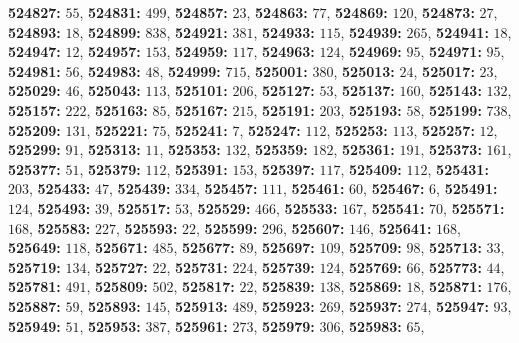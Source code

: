 \textsf{\bfseries 524827:} $55$, \textsf{\bfseries 524831:} $499$, \textsf{\bfseries 524857:} $23$, \textsf{\bfseries 524863:} $77$, \textsf{\bfseries 524869:} $120$, \textsf{\bfseries 524873:} $27$, \textsf{\bfseries 524893:} $18$, \textsf{\bfseries 524899:} $838$, \textsf{\bfseries 524921:} $381$, \textsf{\bfseries 524933:} $115$, \textsf{\bfseries 524939:} $265$, \textsf{\bfseries 524941:} $18$, \textsf{\bfseries 524947:} $12$, \textsf{\bfseries 524957:} $153$, \textsf{\bfseries 524959:} $117$, \textsf{\bfseries 524963:} $124$, \textsf{\bfseries 524969:} $95$, \textsf{\bfseries 524971:} $95$, \textsf{\bfseries 524981:} $56$, \textsf{\bfseries 524983:} $48$, \textsf{\bfseries 524999:} $715$, \textsf{\bfseries 525001:} $380$, \textsf{\bfseries 525013:} $24$, \textsf{\bfseries 525017:} $23$, \textsf{\bfseries 525029:} $46$, \textsf{\bfseries 525043:} $113$, \textsf{\bfseries 525101:} $206$, \textsf{\bfseries 525127:} $53$, \textsf{\bfseries 525137:} $160$, \textsf{\bfseries 525143:} $132$, \textsf{\bfseries 525157:} $222$, \textsf{\bfseries 525163:} $85$, \textsf{\bfseries 525167:} $215$, \textsf{\bfseries 525191:} $203$, \textsf{\bfseries 525193:} $58$, \textsf{\bfseries 525199:} $738$, \textsf{\bfseries 525209:} $131$, \textsf{\bfseries 525221:} $75$, \textsf{\bfseries 525241:} $7$, \textsf{\bfseries 525247:} $112$, \textsf{\bfseries 525253:} $113$, \textsf{\bfseries 525257:} $12$, \textsf{\bfseries 525299:} $91$, \textsf{\bfseries 525313:} $11$, \textsf{\bfseries 525353:} $132$, \textsf{\bfseries 525359:} $182$, \textsf{\bfseries 525361:} $191$, \textsf{\bfseries 525373:} $161$, \textsf{\bfseries 525377:} $51$, \textsf{\bfseries 525379:} $112$, \textsf{\bfseries 525391:} $153$, \textsf{\bfseries 525397:} $117$, \textsf{\bfseries 525409:} $112$, \textsf{\bfseries 525431:} $203$, \textsf{\bfseries 525433:} $47$, \textsf{\bfseries 525439:} $334$, \textsf{\bfseries 525457:} $111$, \textsf{\bfseries 525461:} $60$, \textsf{\bfseries 525467:} $6$, \textsf{\bfseries 525491:} $124$, \textsf{\bfseries 525493:} $39$, \textsf{\bfseries 525517:} $53$, \textsf{\bfseries 525529:} $466$, \textsf{\bfseries 525533:} $167$, \textsf{\bfseries 525541:} $70$, \textsf{\bfseries 525571:} $168$, \textsf{\bfseries 525583:} $227$, \textsf{\bfseries 525593:} $22$, \textsf{\bfseries 525599:} $296$, \textsf{\bfseries 525607:} $146$, \textsf{\bfseries 525641:} $168$, \textsf{\bfseries 525649:} $118$, \textsf{\bfseries 525671:} $485$, \textsf{\bfseries 525677:} $89$, \textsf{\bfseries 525697:} $109$, \textsf{\bfseries 525709:} $98$, \textsf{\bfseries 525713:} $33$, \textsf{\bfseries 525719:} $134$, \textsf{\bfseries 525727:} $22$, \textsf{\bfseries 525731:} $224$, \textsf{\bfseries 525739:} $124$, \textsf{\bfseries 525769:} $66$, \textsf{\bfseries 525773:} $44$, \textsf{\bfseries 525781:} $491$, \textsf{\bfseries 525809:} $502$, \textsf{\bfseries 525817:} $22$, \textsf{\bfseries 525839:} $138$, \textsf{\bfseries 525869:} $18$, \textsf{\bfseries 525871:} $176$, \textsf{\bfseries 525887:} $59$, \textsf{\bfseries 525893:} $145$, \textsf{\bfseries 525913:} $489$, \textsf{\bfseries 525923:} $269$, \textsf{\bfseries 525937:} $274$, \textsf{\bfseries 525947:} $93$, \textsf{\bfseries 525949:} $51$, \textsf{\bfseries 525953:} $387$, \textsf{\bfseries 525961:} $273$, \textsf{\bfseries 525979:} $306$, \textsf{\bfseries 525983:} $65$, 
